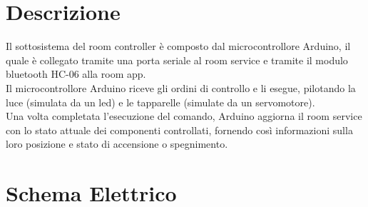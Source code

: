 \documentclass[a4paper]{report}
\begin{document}
\section{Descrizione}
Il sottosistema del room controller è composto dal microcontrollore Arduino, il quale è collegato tramite una porta seriale al room service e tramite il modulo bluetooth HC-06 alla room app.\\
Il microcontrollore Arduino riceve gli ordini di controllo e li esegue, pilotando la luce (simulata da un led) e le tapparelle (simulate da un servomotore).\\
Una volta completata l'esecuzione del comando, Arduino aggiorna il room service con lo stato attuale dei componenti controllati, fornendo così informazioni sulla loro posizione e stato di accensione o spegnimento.
\vspace{1cm}
\section{Schema Elettrico}

\begin{center}
\end{center}

\vspace{3cm}
\end{document}
